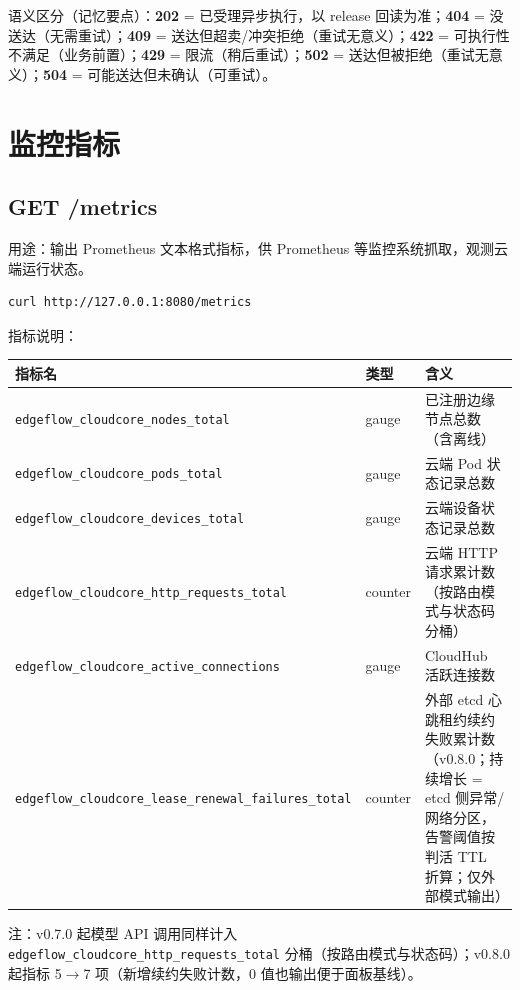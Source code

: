 语义区分（记忆要点）：\textbf{202} = 已受理异步执行，以 release 回读为准；\textbf{404} = 没送达（无需重试）；\textbf{409} = 送达但超卖/冲突拒绝（重试无意义）；\textbf{422} = 可执行性不满足（业务前置）；\textbf{429} = 限流（稍后重试）；\textbf{502} = 送达但被拒绝（重试无意义）；\textbf{504} = 可能送达但未确认（可重试）。

\section{监控指标}

\subsection{GET /metrics}

用途：输出 Prometheus 文本格式指标，供 Prometheus 等监控系统抓取，观测云端运行状态。

\begin{lstlisting}
curl http://127.0.0.1:8080/metrics
\end{lstlisting}

指标说明：

\begin{tabularx}{\textwidth}{l l X}
  \toprule
  \textbf{指标名} & \textbf{类型} & \textbf{含义} \\
  \midrule
  \texttt{edgeflow\_cloudcore\_nodes\_total} & gauge & 已注册边缘节点总数（含离线） \\
  \texttt{edgeflow\_cloudcore\_pods\_total} & gauge & 云端 Pod 状态记录总数 \\
  \texttt{edgeflow\_cloudcore\_devices\_total} & gauge & 云端设备状态记录总数 \\
  \texttt{edgeflow\_cloudcore\_http\_requests\_total} & counter & 云端 HTTP 请求累计数（按路由模式与状态码分桶） \\
  \texttt{edgeflow\_cloudcore\_active\_connections} & gauge & CloudHub 活跃连接数 \\
  \texttt{edgeflow\_cloudcore\_lease\_renewal\_failures\_total} & counter & 外部 etcd 心跳租约续约失败累计数（v0.8.0；持续增长 = etcd 侧异常/网络分区，告警阈值按判活 TTL 折算；仅外部模式输出） \\
  \bottomrule
\end{tabularx}

注：v0.7.0 起模型 API 调用同样计入 \texttt{edgeflow\_cloudcore\_http\_requests\_total} 分桶（按路由模式与状态码）；v0.8.0 起指标 5$\rightarrow$7 项（新增续约失败计数，0 值也输出便于面板基线）。


